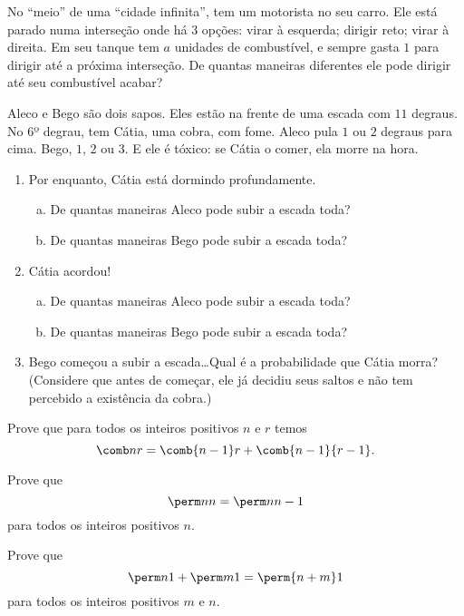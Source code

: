 \begin{exercise}
	No ``meio'' de uma ``cidade infinita'', tem um motorista no seu carro. Ele está parado numa interseção onde há $3$ opções: virar à esquerda; dirigir reto; virar à direita. Em seu tanque tem $a$ unidades de combustível, e sempre gasta $1$ para dirigir até a próxima interseção. De quantas maneiras diferentes ele pode dirigir até seu combustível acabar?
\end{exercise}

\begin{exercise}
	Aleco e Bego são dois sapos. Eles estão na frente de uma escada com $11$ degraus. No $6$º degrau, tem Cátia, uma cobra, com fome. Aleco pula $1$ ou $2$ degraus para cima. Bego, $1$, $2$ ou $3$. E ele é tóxico: se Cátia o comer, ela morre na hora.
	\begin{enumerate}[(1)]
		\item Por enquanto, Cátia está dormindo profundamente.
			\begin{enumerate}[(a)]
				\item De quantas maneiras Aleco pode subir a escada toda?
				\item De quantas maneiras Bego pode subir a escada toda?
			\end{enumerate}
		\item Cátia acordou!
			\begin{enumerate}[(a)]
				\item De quantas maneiras Aleco pode subir a escada toda?
				\item De quantas maneiras Bego pode subir a escada toda?
			\end{enumerate}
		\item Bego começou a subir a escada\ldots Qual é a probabilidade que Cátia morra? (Considere que antes de começar, ele já decidiu seus saltos e não tem percebido a existência da cobra.)
	\end{enumerate}
\end{exercise}

\begin{exercise}
	Prove que para todos os inteiros positivos $n$ e $r$ temos
	$$
		\comb n r = \comb {n - 1} r + \comb {n - 1} {r - 1}.
	$$
\end{exercise}

\begin{homework}
	Prove que
	$$
		\perm n n = \perm n {n-1}
	$$
	para todos os inteiros positivos $n$.
\end{homework}

\begin{homework}
	Prove que
	$$
		\perm n 1 + \perm m 1 = \perm {n + m} 1
	$$
	para todos os inteiros positivos $m$ e $n$.
\end{homework}
